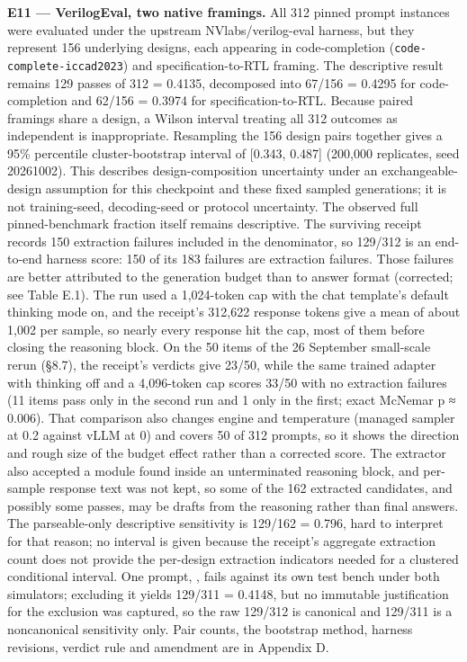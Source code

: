 \documentclass[12pt,a4paper]{report}
\DeclareRobustCommand{\longtok}[1]{\texttt{\seqsplit{#1}}}
\begin{document}
\textbf{E11 --- VerilogEval, two native framings.} All 312 pinned prompt
instances were evaluated under the upstream NVlabs/verilog-eval harness,
but they represent 156 underlying designs, each appearing in
code-completion (\texttt{code-complete-iccad2023}) and
specification-to-RTL framing. The descriptive result remains 129 passes
of 312 = 0.4135, decomposed into 67/156 = 0.4295 for code-completion and
62/156 = 0.3974 for specification-to-RTL. Because paired framings share
a design, a Wilson interval treating all 312 outcomes as independent is
inappropriate. Resampling the 156 design pairs together gives a 95\%
percentile cluster-bootstrap interval of {[}0.343, 0.487{]} (200,000
replicates, seed 20261002). This describes design-composition
uncertainty under an exchangeable-design assumption for this checkpoint
and these fixed sampled generations; it is not training-seed,
decoding-seed or protocol uncertainty. The observed full
pinned-benchmark fraction itself remains descriptive. The surviving
receipt records 150 extraction failures included in the denominator, so
129/312 is an end-to-end harness score: 150 of its 183 failures are
extraction failures. Those failures are better attributed to the
generation budget than to answer format (corrected; see Table E.1). The
run used a 1,024-token cap with the chat template's default thinking
mode on, and the receipt's 312,622 response tokens give a mean of about
1,002 per sample, so nearly every response hit the cap, most of them
before closing the reasoning block. On the 50 items of the 26 September
small-scale rerun (§8.7), the receipt's verdicts give 23/50, while the
same trained adapter with thinking off and a 4,096-token cap scores
33/50 with no extraction failures (11 items pass only in the second run
and 1 only in the first; exact McNemar p ≈ 0.006). That comparison also
changes engine and temperature (managed sampler at 0.2 against vLLM at
0) and covers 50 of 312 prompts, so it shows the direction and rough
size of the budget effect rather than a corrected score. The extractor
also accepted a module found inside an unterminated reasoning block, and
per-sample response text was not kept, so some of the 162 extracted
candidates, and possibly some passes, may be drafts from the reasoning
rather than final answers. The parseable-only descriptive sensitivity is
129/162 = 0.796, hard to interpret for that reason; no interval is given
because the receipt's aggregate extraction count does not provide the
per-design extraction indicators needed for a clustered conditional
interval. One prompt,
\longtok{verilog\_eval/spec-to-rtl/Prob099\_\allowbreak{}m2014\_\allowbreak{}q6c}, fails against
its own test bench under both simulators; excluding it yields 129/311 =
0.4148, but no immutable justification for the exclusion was captured,
so the raw 129/312 is canonical and 129/311 is a noncanonical
sensitivity only. Pair counts, the bootstrap method, harness revisions,
verdict rule and amendment are in Appendix D.
\end{document}
